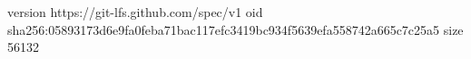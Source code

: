 version https://git-lfs.github.com/spec/v1
oid sha256:05893173d6e9fa0feba71bac117efc3419bc934f5639efa558742a665c7c25a5
size 56132

